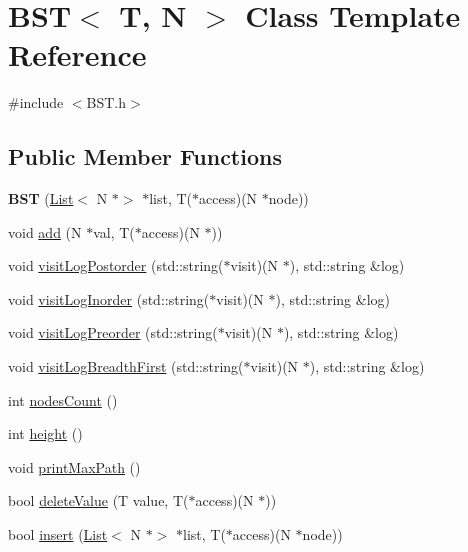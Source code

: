 \hypertarget{class_b_s_t}{}\section{B\+ST$<$ T, N $>$ Class Template Reference}
\label{class_b_s_t}


{\ttfamily \#include $<$B\+S\+T.\+h$>$}

\subsection*{Public Member Functions}
\begin{DoxyCompactItemize}
\item 
\mbox{\label{class_b_s_t_a526d4abc3bd006d96953cb685543b4a8}} 
{\bfseries B\+ST} (\hyperlink{class_list}{List}$<$ N $\ast$$>$ $\ast$list, T($\ast$access)(N $\ast$node))
\item 
void \hyperlink{class_b_s_t_afc990532c54fba36b8501836b1834ac6}{add} (N $\ast$val, T($\ast$access)(N $\ast$))
\item 
void \hyperlink{class_b_s_t_a831b6fdcda13b7a353e03992b9c965b7}{visit\+Log\+Postorder} (std\+::string($\ast$visit)(N $\ast$), std\+::string \&log)
\item 
void \hyperlink{class_b_s_t_a04d669d91c9528c61f618d022999ea26}{visit\+Log\+Inorder} (std\+::string($\ast$visit)(N $\ast$), std\+::string \&log)
\item 
void \hyperlink{class_b_s_t_a7ed3924d6f70e52c7a6bc1d5bddbb31d}{visit\+Log\+Preorder} (std\+::string($\ast$visit)(N $\ast$), std\+::string \&log)
\item 
void \hyperlink{class_b_s_t_a3e958de8a85c1268b11006a3ed32a7bb}{visit\+Log\+Breadth\+First} (std\+::string($\ast$visit)(N $\ast$), std\+::string \&log)
\item 
int \hyperlink{class_b_s_t_a86fb81e20a21ef65e2b57e55d910d875}{nodes\+Count} ()
\item 
int \hyperlink{class_b_s_t_a84bfd35b9fdf74574ffcac8b33a129b3}{height} ()
\item 
void \hyperlink{class_b_s_t_abd50732adeb88dbb562a640d06a0c25f}{print\+Max\+Path} ()
\item 
bool \hyperlink{class_b_s_t_a88f2c430e8212991efdb6f28d30a7f8c}{delete\+Value} (T value, T($\ast$access)(N $\ast$))
\item 
bool \hyperlink{class_b_s_t_a69e01758890117297b34b79317c7c112}{insert} (\hyperlink{class_list}{List}$<$ N $\ast$$>$ $\ast$list, T($\ast$access)(N $\ast$node))
\end{DoxyCompactItemize}



